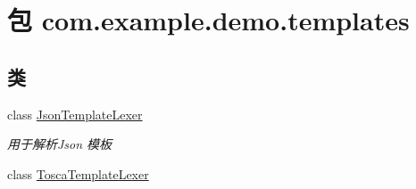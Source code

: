 \hypertarget{namespacecom_1_1example_1_1demo_1_1templates}{}\section{包 com.\+example.\+demo.\+templates}
\label{namespacecom_1_1example_1_1demo_1_1templates}
\subsection*{类}
\begin{DoxyCompactItemize}
\item 
class \mbox{\hyperlink{classcom_1_1example_1_1demo_1_1templates_1_1_json_template_lexer}{Json\+Template\+Lexer}}
\begin{DoxyCompactList}\small\item\em 用于解析\+Json 模板 \end{DoxyCompactList}\item 
class \mbox{\hyperlink{classcom_1_1example_1_1demo_1_1templates_1_1_tosca_template_lexer}{Tosca\+Template\+Lexer}}
\end{DoxyCompactItemize}
